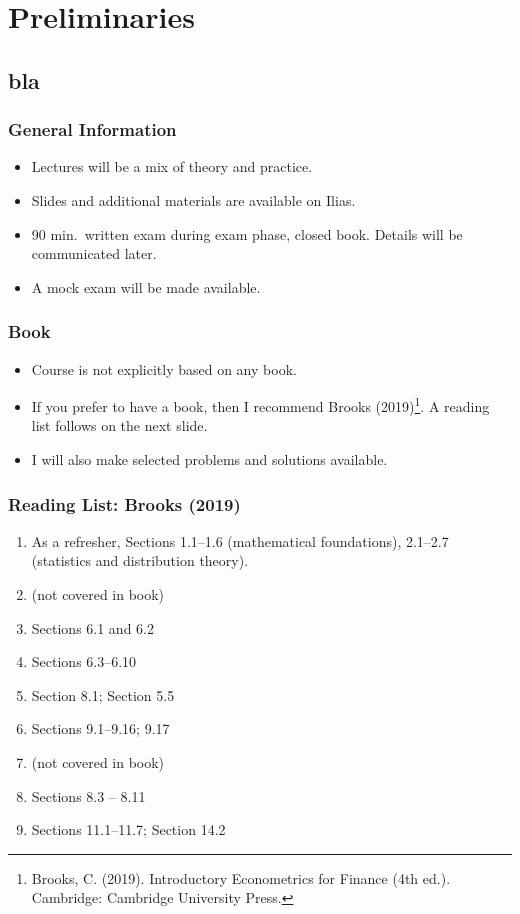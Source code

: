 

\frame{\titlepage}


\section{Preliminaries}\subsection*{bla}
\begin{frame}
\frametitle{General Information}
\begin{itemize}
\item Lectures will be a mix of theory and practice.
\item Slides and additional materials are available on Ilias.
\item 90 min.\ written exam during exam phase, closed book. Details will be communicated later.
\item A mock exam will be made available.
\end{itemize}
\end{frame}
\begin{frame}
\frametitle{Book}
\begin{itemize}
\item Course is not explicitly based on any book.
\item If you prefer to have a book, then I recommend Brooks (2019)\footnote{Brooks, C. (2019). Introductory Econometrics for Finance (4th ed.). Cambridge: Cambridge University Press.}. A reading list follows on the next slide.
\item I will also make selected problems and solutions available.
\end{itemize}
\end{frame}
\begin{frame}
\frametitle{Reading List: Brooks (2019)}

\begin{enumerate}
\item[Pre] As a refresher, Sections 1.1--1.6 (mathematical foundations), 2.1--2.7 (statistics and distribution theory).
\item[Week 1] (not covered in book)
\item[Week 2] Sections 6.1 and 6.2
\item[Week 3] Sections 6.3--6.10
\item[Week 4] Section 8.1; Section 5.5
\item[Week 5] Sections 9.1--9.16; 9.17
\item[Week 6] (not covered in book)
\item[Week 7] Sections 8.3 -- 8.11
\item[Week 7] Sections 11.1--11.7; Section 14.2

\end{enumerate}
\end{frame}
